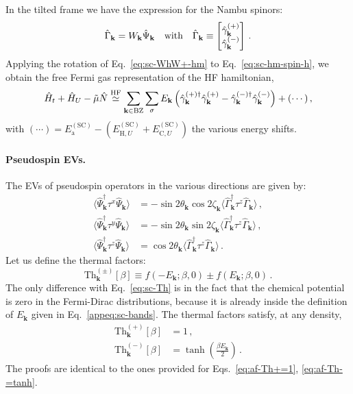 In the tilted frame we have the expression for the Nambu spinors:
\begin{equation}\label{eq:sc-Gamma=WPsi}
	\hat\Gamma_\mathbf{k} = W_\mathbf{k} \hat \Psi_\mathbf{k} \qq{with}
	\hat\Gamma_\mathbf{k} \equiv \begin{bmatrix}
		\hat \gamma_\mathbf{k}^{(+)} \\ \hat \gamma_\mathbf{k}^{(-)}
	\end{bmatrix} \, .
\end{equation}
Applying the rotation of Eq.~\eqref{eq:sc-WhW+-hm} to Eq.~\eqref{eq:sc-hm-spin-h}, we obtain the free Fermi gas representation of the HF hamiltonian,
\[
\hat H_t + \hat H_U - \tilde{\mu} \hat N \stackrel{\mathrm{HF}}{\simeq} \sum_{\mathbf{k} \in \mathrm{BZ}} \sum_\sigma E_\mathbf{k} \left(
\hat \gamma_\mathbf{k}^{(+)\dagger} \hat \gamma_\mathbf{k}^{(+)} - \hat \gamma_\mathbf{k}^{(-)\dagger} \hat \gamma_\mathbf{k}^{(-)}
\right) + (\cdots) \, ,
\]
with $(\cdots) = E_\mathrm{a}^{(\mathrm{SC})} - \left(
E_{\mathrm{H},U}^{(\mathrm{SC})} + E_{\mathrm{C},U}^{(\mathrm{SC})}
\right)$ the various energy shifts.

\paragraph{Pseudospin EVs.}

The EVs of pseudospin operators in the various directions are given by:
\[
\begin{aligned}
	\langle \hat \Psi_\mathbf{k}^\dagger \tau^x \hat \Psi_\mathbf{k} \rangle &= -\sin 2\theta_\mathbf{k} \cos 2\zeta_\mathbf{k} \langle \hat \Gamma_\mathbf{k}^\dagger \tau^z \hat \Gamma_\mathbf{k} \rangle \, ,\\
	\langle \hat \Psi_\mathbf{k}^\dagger \tau^y \hat \Psi_\mathbf{k} \rangle &= -\sin 2\theta_\mathbf{k} \sin 2\zeta_\mathbf{k} \langle \hat \Gamma_\mathbf{k}^\dagger \tau^z \hat \Gamma_\mathbf{k} \rangle \, , \\
	\langle \hat \Psi_\mathbf{k}^\dagger \tau^z \hat \Psi_\mathbf{k} \rangle &= \cos 2\theta_\mathbf{k} \langle \hat \Gamma_\mathbf{k}^\dagger \tau^z \hat \Gamma_\mathbf{k} \rangle \, .
\end{aligned}
\]
Let us define the thermal factors:
\begin{equation}\label{eq:sc-Th}
	\mathrm{Th}_\mathbf{k}^{(\pm)}[\beta] \equiv 
	f\left(
	-E_\mathbf{k};\beta,0
	\right) \pm f\left(
	E_\mathbf{k};\beta,0
	\right) \, .
\end{equation}
The only difference with Eq.~\eqref{eq:sc-Th} is in the fact that the chemical potential is zero in the Fermi-Dirac distributions, because it is already inside the definition of $E_\mathbf{k}$ given in Eq.~\eqref{appeq:sc-bands}. The thermal factors satisfy, at any density,
\begin{align}
	\mathrm{Th}_\mathbf{k}^{(+)}[\beta] &= 1 \, , \label{eq:sc-Th+=1} \\
	\mathrm{Th}_\mathbf{k}^{(-)}[\beta] &= \tanh(\frac{\beta E_\mathbf{k}}{2}) \, . \label{eq:sc-Th-=tanh}
\end{align}
The proofs are identical to the ones provided for Eqs.~\eqref{eq:af-Th+=1}, \eqref{eq:af-Th-=tanh}. 

